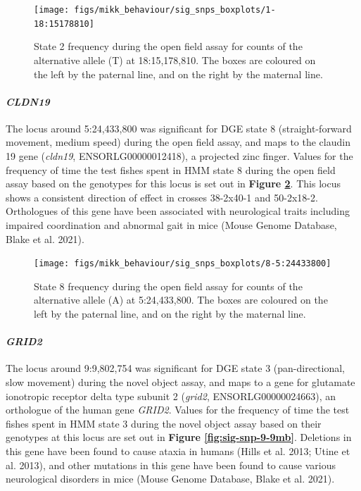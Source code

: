 \documentclass[
]{book}
\begin{document}
\begin{figure}
\texttt{[image: figs/mikk\_behaviour/sig\_snps\_boxplots/1-18:15178810]} \caption{State 2 frequency during the open field assay for counts of the alternative allele (T) at 18:15,178,810. The boxes are coloured on the left by the paternal line, and on the right by the maternal line.}\label{fig:sig-snp-18-15mb}
\end{figure}

\hypertarget{cldn19}{%
\paragraph{\texorpdfstring{\emph{CLDN19}}{CLDN19}}\label{cldn19}}

The locus around 5:24,433,800 was significant for DGE state 8 (straight-forward movement, medium speed) during the open field assay, and maps to the claudin 19 gene (\emph{cldn19}, ENSORLG00000012418), a projected zinc finger. Values for the frequency of time the test fishes spent in HMM state 8 during the open field assay based on the genotypes for this locus is set out in \textbf{Figure \ref{fig:sig-snp-5-24mb}}. This locus shows a consistent direction of effect in crosses 38-2x40-1 and 50-2x18-2. Orthologues of this gene have been associated with neurological traits including impaired coordination and abnormal gait in mice (Mouse Genome Database, Blake et al. 2021).



\begin{figure}

{\centering \texttt{[image: figs/mikk\_behaviour/sig\_snps\_boxplots/8-5:24433800]} 

}

\caption{State 8 frequency during the open field assay for counts of the alternative allele (A) at 5:24,433,800. The boxes are coloured on the left by the paternal line, and on the right by the maternal line.}\label{fig:sig-snp-5-24mb}
\end{figure}

\hypertarget{grid2}{%
\paragraph{\texorpdfstring{\emph{GRID2}}{GRID2}}\label{grid2}}

The locus around 9:9,802,754 was significant for DGE state 3 (pan-directional, slow movement) during the novel object assay, and maps to a gene for glutamate ionotropic receptor delta type subunit 2 (\emph{grid2}, ENSORLG00000024663), an orthologue of the human gene \emph{GRID2}. Values for the frequency of time the test fishes spent in HMM state 3 during the novel object assay based on their genotypes at this locus are set out in \textbf{Figure \ref{fig:sig-snp-9-9mb}}. Deletions in this gene have been found to cause ataxia in humans (Hills et al. 2013; Utine et al. 2013), and other mutations in this gene have been found to cause various neurological disorders in mice (Mouse Genome Database, Blake et al. 2021).
\end{document}
